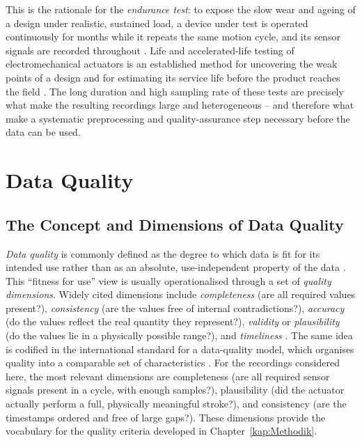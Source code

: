 This is the rationale for the \emph{endurance test}: to expose the slow wear and ageing of
a design under realistic, sustained load, a device under test is operated continuously for
months while it repeats the same motion cycle, and its sensor signals are recorded
throughout \parencite{oconnor_practical_2012}. Life and accelerated-life testing of
electromechanical actuators is an established method for uncovering the weak points of a
design and for estimating its service life before the product reaches the
field \parencite{han_accelerated_2019}. The long duration and high sampling rate of these
tests are precisely what make the resulting recordings large and heterogeneous -- and
therefore what make a systematic preprocessing and quality-assurance step necessary before
the data can be used.

\section{Data Quality}
\label{sec:Grundlagen_Datenqualitaet}

\subsection{The Concept and Dimensions of Data Quality}
\label{subsec:Grundlagen_DQ_Dimensionen}

\emph{Data quality} is commonly defined as the degree to which data is fit for its
intended use rather than as an absolute, use-independent property of the
data \parencite{TODO-data-quality}. This ``fitness for use'' view is usually operationalised
through a set of \emph{quality dimensions}. Widely cited dimensions
include \emph{completeness} (are all required values present?), \emph{consistency} (are the
values free of internal contradictions?), \emph{accuracy} (do the values reflect the real
quantity they represent?), \emph{validity} or \emph{plausibility} (do the values lie in a
physically possible range?), and \emph{timeliness} \parencite{TODO-data-quality-dimensions}.
The same idea is codified in the international standard for a data-quality model, which
organises quality into a comparable set of characteristics
\parencite{TODO-iso25012}. For the recordings considered here, the most relevant dimensions
are completeness (are all required sensor signals present in a cycle, with enough
samples?), plausibility (did the actuator actually perform a full, physically meaningful
stroke?), and consistency (are the timestamps ordered and free of large gaps?). These
dimensions provide the vocabulary for the quality criteria developed in
Chapter~\ref{kap:Methodik}.

